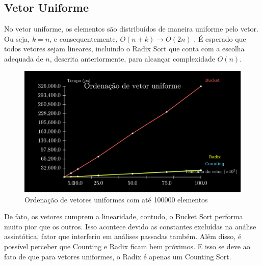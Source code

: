 \documentclass[fontsize=11pt]{article}
\begin{document}
    \subsection{Vetor Uniforme}
      No vetor uniforme, os elementos são distribuídos de maneira uniforme pelo vetor. Ou seja, $k = n$, 
      e consequentemente, $O(n+k) \rightarrow O(2n)$  \label{uniforme}.
      É esperado que todos vetores sejam lineares, incluindo o Radix Sort que conta
      com a escolha adequada de $n$, descrita anteriormente, para alcançar complexidade $O(n)$.
      \begin{figure}[H]
        \includegraphics[width=\textwidth]{uniforme.png} 
        \caption{Ordenação de vetores uniformes com até 100000 elementos}
        \label{fig:uniforme}
      \end{figure}
      De fato, os vetores cumprem a linearidade, contudo, o Bucket Sort performa muito pior que os outros.
      Isso acontece devido as constantes excluídas na análise assintótica, fator que interferiu 
      em análises passadas também. 
      Além disso, é possível perceber que Counting e Radix ficam bem próximos. E isso se deve ao fato de
      que para vetores uniformes, o Radix é apenas um Counting Sort.
      \newpage
\end{document}
